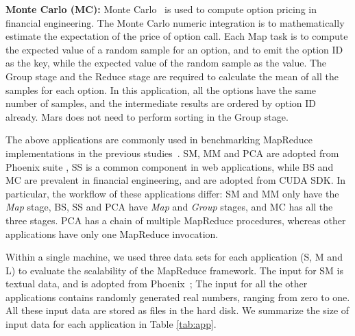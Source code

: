 

{\bf Monte Carlo (MC):} Monte Carlo~\cite{Boyle1977} is used to compute option pricing in financial engineering.
The Monte Carlo numeric integration is to mathematically estimate the expectation of the price of option call.
Each Map task is to compute the expected value of a random sample for an option, and to emit the option ID as the key, while the expected value of the random sample as the value.
The Group stage and the Reduce stage are required to calculate the mean of all the samples for each option.
In this application, all the options have the same number of samples, and the intermediate results are ordered by option ID already. Mars does not need to perform sorting in the Group stage.

The above applications are commonly used in benchmarking MapReduce implementations in the previous studies~\cite{Chu2006, Ranger2007}. SM, MM and PCA are adopted from Phoenix suite \cite{Ranger2007},  SS is a common component in web applications,
while BS and MC are prevalent in financial engineering, and are adopted from CUDA SDK.
In particular, the workflow of these applications differ: SM and
MM only have the {\em Map} stage, BS, SS and PCA have {\em Map} and {\em
Group} stages, and MC has all the three stages. PCA has a chain of multiple MapReduce procedures, whereas other applications have
only one MapReduce invocation.

Within a single machine, we used three data sets
for each application (S, M and L) to evaluate the scalability of the
MapReduce framework.
The input for SM is textual data, and is adopted from Phoenix~\cite{Ranger2007};
The input for all the other applications contains randomly generated real numbers, ranging from zero to one.
All these input data are stored as files in the hard disk.
We summarize the size of input data for each application in Table \ref{tab:app}.

